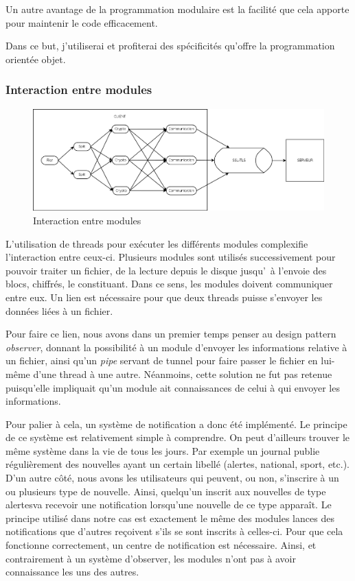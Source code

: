 \documentclass[a4paper,10pt, twoside]{report}
\begin{document}
\begin{spacing}{1.2}
Un autre avantage de la programmation modulaire est la facilit\'e que cela
apporte pour maintenir le code efficacement.

Dans ce but, j'utiliserai et profiterai des sp\'ecificit\'es qu'offre la
programmation orient\'ee objet.

\subsubsection{Interaction entre modules}

\begin{figure}[h!]
    \centering
    \includegraphics[width=17cm]{softwareDesign/moduleInteraction.png}
    \caption{\label{interactModule} Interaction entre modules}
\end{figure}

L'utilisation de threads pour ex\'ecuter les diff\'erents modules complexifie
l'interaction entre ceux-ci. Plusieurs modules sont utilis\'es successivement
pour pouvoir traiter un fichier, de la lecture depuis le disque jusqu'\ \`a
l'envoie des blocs, chiffr\'es, le constituant. Dans ce sens, les modules
doivent communiquer entre eux. Un lien est n\'ecessaire pour que deux threads
puisse s'envoyer les donn\'ees li\'ees \`a un fichier.

Pour faire ce lien, nous avons dans un premier temps penser au design pattern
\textit{observer}, donnant la possibilit\'e \`a un module d'envoyer les
informations relative \`a un fichier, ainsi qu'un \textit{pipe} servant de
tunnel pour faire passer le fichier en lui-m\^eme d'une thread \`a une autre.
N\'eanmoins, cette solution ne fut pas retenue puisqu'elle impliquait qu'un
module ait connaissances de celui \`a qui envoyer les informations.

Pour palier \`a cela, un syst\`eme de notification a donc \'et\'e
impl\'ement\'e. Le principe de ce syst\`eme est relativement simple \`a
comprendre. On peut d'ailleurs trouver le m\^eme syst\`eme dans la vie de
tous les jours. Par exemple un journal publie r\'eguli\`erement des nouvelles
ayant un certain libell\'e (\flqq alertes\frqq, \flqq national\frqq, \flqq
sport\frqq, etc.). D'un autre c\^ot\'e, nous avons les utilisateurs qui
peuvent, ou non, s'inscrire \`a un ou plusieurs type de nouvelle. Ainsi, 
quelqu'un inscrit aux nouvelles de type \flqq alertes\frqq va recevoir une
notification lorsqu'une nouvelle de ce type appara\^it. Le principe utilis\'e
dans notre cas est exactement le m\^eme des modules lances des notifications
que d'autres re\c{c}oivent s'ils se sont inscrits \`a celles-ci. Pour que cela
fonctionne correctement, un centre de notification est n\'ecessaire. Ainsi, et
contrairement \`a un syst\`eme d'\flqq observer\frqq, les modules n'ont pas
\`a avoir connaissance les uns des autres.


\end{spacing}
\end{document}
